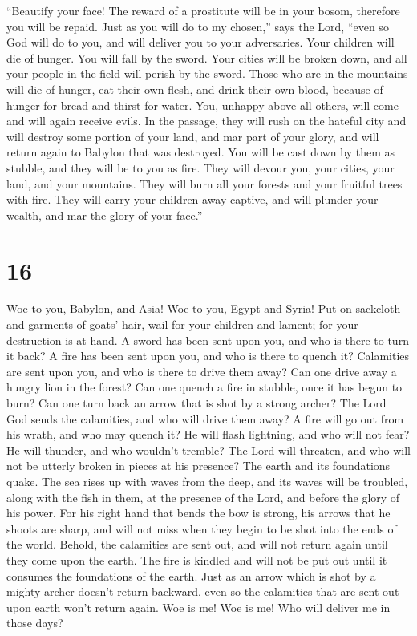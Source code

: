 ``Beautify your face!  The reward of a
prostitute will be in your bosom, therefore you will be repaid.
 Just as you will do to my chosen,'' says the Lord, ``even
so God will do to you, and will deliver you to your adversaries.
 Your children will die of hunger. You will fall by the
sword. Your cities will be broken down, and all your people in the field
will perish by the sword.  Those who are in the mountains
will die of hunger, eat their own flesh, and drink their own blood,
because of hunger for bread and thirst for water.  You,
unhappy above all others, will come and will again receive evils.
 In the passage, they will rush on the hateful city and
will destroy some portion of your land, and mar part of your glory, and
will return again to Babylon that was destroyed.  You will
be cast down by them as stubble, and they will be to you as fire.
 They will devour you, your cities, your land, and your
mountains. They will burn all your forests and your fruitful trees with
fire.  They will carry your children away captive, and will
plunder your wealth, and mar the glory of your face.''

\hypertarget{section-15}{%
\section{16}\label{section-15}}

 Woe to you, Babylon, and Asia! Woe to you, Egypt and Syria!
 Put on sackcloth and garments of goats' hair, wail for your
children and lament; for your destruction is at hand.  A
sword has been sent upon you, and who is there to turn it back?
 A fire has been sent upon you, and who is there to quench
it?  Calamities are sent upon you, and who is there to drive
them away?  Can one drive away a hungry lion in the forest?
Can one quench a fire in stubble, once it has begun to burn?
 Can one turn back an arrow that is shot by a strong archer?
 The Lord God sends the calamities, and who will drive them
away?  A fire will go out from his wrath, and who may quench
it?  He will flash lightning, and who will not fear? He
will thunder, and who wouldn't tremble?  The Lord will
threaten, and who will not be utterly broken in pieces at his presence?
 The earth and its foundations quake. The sea rises up with
waves from the deep, and its waves will be troubled, along with the fish
in them, at the presence of the Lord, and before the glory of his power.
 For his right hand that bends the bow is strong, his
arrows that he shoots are sharp, and will not miss when they begin to be
shot into the ends of the world.  Behold, the calamities
are sent out, and will not return again until they come upon the earth.
 The fire is kindled and will not be put out until it
consumes the foundations of the earth.  Just as an arrow
which is shot by a mighty archer doesn't return backward, even so the
calamities that are sent out upon earth won't return again.
 Woe is me! Woe is me! Who will deliver me in those days?

